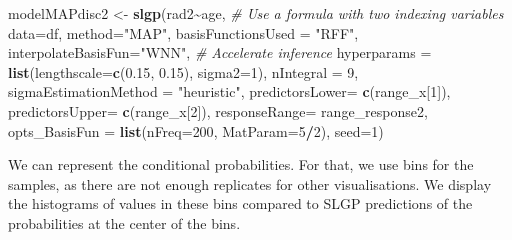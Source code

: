 \documentclass[
]{article}
\newenvironment{Shaded}{\begin{snugshade}}{\end{snugshade}}
\newcommand{\AttributeTok}[1]{\textcolor[rgb]{0.13,0.29,0.53}{#1}}
\newcommand{\CommentTok}[1]{\textcolor[rgb]{0.56,0.35,0.01}{\textit{#1}}}
\newcommand{\DecValTok}[1]{\textcolor[rgb]{0.00,0.00,0.81}{#1}}
\newcommand{\FloatTok}[1]{\textcolor[rgb]{0.00,0.00,0.81}{#1}}
\newcommand{\FunctionTok}[1]{\textcolor[rgb]{0.13,0.29,0.53}{\textbf{#1}}}
\newcommand{\NormalTok}[1]{#1}
\newcommand{\OtherTok}[1]{\textcolor[rgb]{0.56,0.35,0.01}{#1}}
\newcommand{\SpecialCharTok}[1]{\textcolor[rgb]{0.81,0.36,0.00}{\textbf{#1}}}
\newcommand{\StringTok}[1]{\textcolor[rgb]{0.31,0.60,0.02}{#1}}
\begin{document}
\begin{Shaded}
\begin{Highlighting}[]
\NormalTok{modelMAPdisc2 }\OtherTok{\textless{}{-}} \FunctionTok{slgp}\NormalTok{(rad2}\SpecialCharTok{\textasciitilde{}}\NormalTok{age, }\CommentTok{\# Use a formula with two indexing variables}
                      \AttributeTok{data=}\NormalTok{df,}
                      \AttributeTok{method=}\StringTok{"MAP"}\NormalTok{, }
                      \AttributeTok{basisFunctionsUsed =} \StringTok{"RFF"}\NormalTok{,}
                      \AttributeTok{interpolateBasisFun=}\StringTok{"WNN"}\NormalTok{, }\CommentTok{\# Accelerate inference}
                      \AttributeTok{hyperparams =} \FunctionTok{list}\NormalTok{(}\AttributeTok{lengthscale=}\FunctionTok{c}\NormalTok{(}\FloatTok{0.15}\NormalTok{, }\FloatTok{0.15}\NormalTok{), }
                                         \AttributeTok{sigma2=}\DecValTok{1}\NormalTok{), }
                      \AttributeTok{nIntegral =} \DecValTok{9}\NormalTok{, }
                      \AttributeTok{sigmaEstimationMethod =} \StringTok{"heuristic"}\NormalTok{, }
                      \AttributeTok{predictorsLower=} \FunctionTok{c}\NormalTok{(range\_x[}\DecValTok{1}\NormalTok{]),}
                      \AttributeTok{predictorsUpper=} \FunctionTok{c}\NormalTok{(range\_x[}\DecValTok{2}\NormalTok{]),}
                      \AttributeTok{responseRange=}\NormalTok{ range\_response2,}
                      \AttributeTok{opts\_BasisFun =} \FunctionTok{list}\NormalTok{(}\AttributeTok{nFreq=}\DecValTok{200}\NormalTok{,}
                                           \AttributeTok{MatParam=}\DecValTok{5}\SpecialCharTok{/}\DecValTok{2}\NormalTok{),}
                      \AttributeTok{seed=}\DecValTok{1}\NormalTok{)}
\end{Highlighting}
\end{Shaded}

We can represent the conditional probabilities. For that, we use bins for the samples, as there are not enough replicates for other visualisations. We display the histograms of values in these bins compared to SLGP predictions of the probabilities at the center of the bins.
\end{document}
